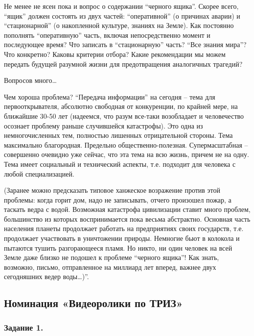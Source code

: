 \documentclass[11pt,a4paper]{article}
\begin{document}
{Не менее не ясен пока и вопрос о содержании “черного ящика”. Скорее всего,
“ящик” должен состоять из двух частей: “оперативной” (о причинах аварии) и
“стационарной” (о накопленной культуре, знаниях на Земле). Как постоянно
пополнять “оперативную” часть, включая непосредственно момент и последующее
время? Что записать в “стационарную” часть? “Все знания мира”? Что конкретно?
Каковы критерии отбора? Какие рекомендации мы можем передать будущей разумной
жизни для предотвращения аналогичных трагедий?

Вопросов много…

Чем хороша проблема? “Передача информации” на сегодня – тема для
первооткрывателя, абсолютно свободная от конкуренции, по крайней мере, на
ближайшие 30-50 лет (надеемся, что разум все-таки возобладает и человечество
осознает проблему раньше случившейся катастрофы). Это одна из немногочисленных
тем, полностью лишенных отрицательной стороны. Тема максимально
благородная. Предельно общественно-полезная. Супермасштабная – совершенно
очевидно уже сейчас, что эта тема на всю жизнь, причем не на одну. Тема имеет
социальный и технический аспекты, т.е. подходит для человека с любой
специализацией.

(Заранее можно предсказать типовое ханжеское возражение против этой проблемы:
когда горит дом, надо не записывать, отчего произошел пожар, а таскать ведра с
водой. Возможная катастрофа цивилизации ставит много проблем, большинство из
которых воспринимается пока весьма абстрактно. Основная часть населения
планеты продолжает работать на предприятиях своих государств, т.е. продолжает
участвовать в уничтожении природы. Немногие бьют в колокола и пытаются тушить
разгорающееся пламя. Но никто, ни один человек на всей Земле даже близко не
подошел к проблеме “черного ящика”! Как знать, возможно, письмо, отправленное
на миллиард лет вперед, важнее двух сегодняшних ведер воды…)”.}

\BlackBoxOfCivilization

\subsection{Номинация «Видеоролики по ТРИЗ»}

\newcommand{\VideoThree}{Проиллюстрируйте с помощью средств кино или анимации
  решение изобретательских задач. Это могут быть как технические решения, так
  и изобретения в нетехнических областях. }

\subsubsection*{Задание 1.}\VideoOne
\end{document}
